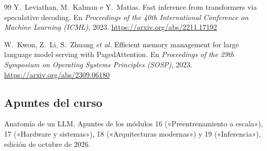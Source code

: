 \begin{thebibliography}{99}
Y.~Leviathan, M.~Kalman e Y.~Matias.
\newblock Fast inference from transformers via speculative decoding.
\newblock En \emph{Proceedings of the 40th International Conference on Machine Learning (ICML)}, 2023.
\newblock \url{https://arxiv.org/abs/2211.17192}

W.~Kwon, Z.~Li, S.~Zhuang \emph{et al.}
\newblock Efficient memory management for large language model serving with PagedAttention.
\newblock En \emph{Proceedings of the 29th Symposium on Operating Systems Principles (SOSP)}, 2023.
\newblock \url{https://arxiv.org/abs/2309.06180}

\subsection*{Apuntes del curso}

Anatomía de un LLM. Apuntes de los módulos 16 («Preentrenamiento a escala»), 17 («Hardware y sistemas»), 18 («Arquitecturas modernas») y 19 («Inferencia»), edición de octubre de 2026.

\end{thebibliography}
